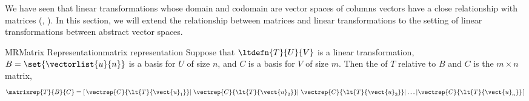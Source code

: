 %
We have seen that linear transformations whose domain and codomain are vector spaces of columns vectors have a close relationship with matrices (, ).  In this section, we will extend the relationship between matrices and linear transformations to the setting of linear transformations between abstract vector spaces.
%
\begin{definition}{MR}{Matrix Representation}{matrix representation}
Suppose that $\ltdefn{T}{U}{V}$ is a linear transformation, $B=\set{\vectorlist{u}{n}}$ is a basis for $U$ of size $n$, and $C$ is a basis for $V$ of size $m$.  Then the  of $T$ relative to $B$ and $C$ is the $m\times n$ matrix,
%
\begin{equation*}
\matrixrep{T}{B}{C}=\left[
\left.\vectrep{C}{\lt{T}{\vect{u}_1}}\right|
\left.\vectrep{C}{\lt{T}{\vect{u}_2}}\right|
\left.\vectrep{C}{\lt{T}{\vect{u}_3}}\right|
\ldots
\left|\vectrep{C}{\lt{T}{\vect{u}_n}}\right.
\right]
\end{equation*}
%
%
\end{definition}
%
%
